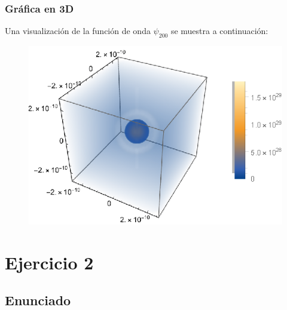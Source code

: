 \documentclass[12pt]{beamer}
\begin{document}
\begin{frame}
\frametitle{Gráfica en 3D}
Una visualización de la función de onda $\psi_{200}$ se muestra a continuación:
\pause
\begin{figure}
   \centering
   \includegraphics[scale=1]{Imagenes/Plot_Funcion_Onda_200.eps}
\end{figure}
\end{frame}

\section{Ejercicio 2}
\subsection{Enunciado}
\end{document}
